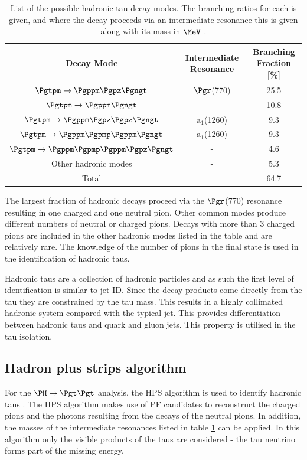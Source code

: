 \begin{table}[bth]
\begin{tabular}{|c|c|c|}
\hline
Decay Mode & Intermediate Resonance & Branching Fraction [\%] \\
\hline
\hline
$\Pgtpm\to\Pgppm\Pgpz\Pgngt$ & $\Pgr$(770) & 25.5 \\
\hline
$\Pgtpm\to\Pgppm\Pgngt$ & -  & 10.8 \\
\hline
$\Pgtpm\to\Pgppm\Pgpz\Pgpz\Pgngt$ & $\text{a}_{1}$(1260) & 9.3 \\
\hline
$\Pgtpm\to\Pgppm\Pgpmp\Pgppm\Pgngt$ & $\text{a}_{1}$(1260) & 9.3 \\
\hline
$\Pgtpm\to\Pgppm\Pgpmp\Pgppm\Pgpz\Pgngt$ & -  & 4.6 \\
\hline
Other hadronic modes & - & 5.3 \\
\hline
\hline
Total & &  64.7 \\
\hline
\end{tabular}
\caption[List of the possible hadronic tau decay modes.]{List of the possible hadronic tau decay modes. The branching ratios for
each is given, and where the decay proceeds via an intermediate resonance this
is given along with its mass in $\MeV$ \cite{PDG}.}
\label{tab:hadronictaus}
\end{table}

The largest fraction of hadronic decays proceed via the $\Pgr$(770) resonance
resulting in one charged and one neutral pion. Other common modes produce
different numbers of neutral or charged pions. Decays with more than 3 charged
pions are included in the other hadronic modes listed in the table and are
relatively rare. The knowledge of the number of pions in the final state is used in the
identification of hadronic taus.

Hadronic taus are a collection of hadronic particles and as such the first level
of identification is similar to jet ID. 
Since the decay products come directly from the tau they are constrained by the
tau mass. This results in a highly collimated hadronic system compared with the
typical jet. This provides differentiation between hadronic taus and
quark and gluon jets. This property is utilised in the tau isolation.

\subsection{Hadron plus strips algorithm}
\label{sec:hps}

For the $\PH \to \Pgt\Pgt$ analysis, the \ac{HPS} algorithm is used to identify
hadronic taus \cite{CMS-PAS-TAU-11-001}. The \ac{HPS} algorithm makes use of \ac{PF} candidates to reconstruct the
charged pions and the photons resulting from the decays of the neutral pions. In
addition, the masses of the intermediate resonances listed in table \ref{tab:hadronictaus} can be
applied. In this algorithm only the visible products of the taus are considered
- the tau neutrino forms part of the missing energy.

